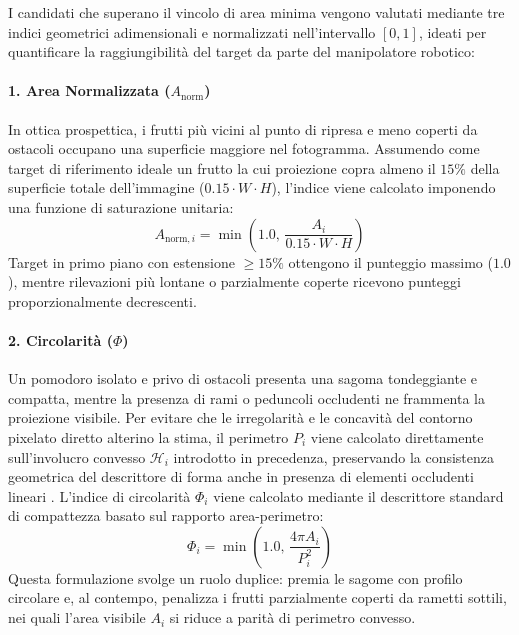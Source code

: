 I candidati che superano il vincolo di area minima vengono valutati mediante tre indici geometrici adimensionali e normalizzati nell'intervallo $[0, 1]$, ideati per quantificare la raggiungibilità del target da parte del manipolatore robotico:

\paragraph{1. Area Normalizzata ($A_{\text{norm}}$)}
In ottica prospettica, i frutti più vicini al punto di ripresa e meno coperti da ostacoli occupano una superficie maggiore nel fotogramma. Assumendo come target di riferimento ideale un frutto la cui proiezione copra almeno il $15\%$ della superficie totale dell'immagine ($0.15 \cdot W \cdot H$), l'indice viene calcolato imponendo una funzione di saturazione unitaria:
\begin{equation}
    A_{\text{norm}, i} = \min \left( 1.0, \, \frac{A_i}{0.15 \cdot W \cdot H} \right)
    \label{eq:area_norm}
\end{equation}
Target in primo piano con estensione $\ge 15\%$ ottengono il punteggio massimo ($1.0$), mentre rilevazioni più lontane o parzialmente coperte ricevono punteggi proporzionalmente decrescenti.

\paragraph{2. Circolarità ($\Phi$)}
Un pomodoro isolato e privo di ostacoli presenta una sagoma tondeggiante e compatta, mentre la presenza di rami o peduncoli occludenti ne frammenta la proiezione visibile. Per evitare che le irregolarità e le concavità del contorno pixelato diretto alterino la stima, il perimetro $P_i$ viene calcolato direttamente sull'involucro convesso $\mathcal{H}_i$ introdotto in precedenza, preservando la consistenza geometrica del descrittore di forma anche in presenza di elementi occludenti lineari \cite{zunic2004convexity}. L'indice di circolarità $\Phi_i$ viene calcolato mediante il descrittore standard di compattezza basato sul rapporto area-perimetro:
\begin{equation}
    \Phi_i = \min \left( 1.0, \, \frac{4\pi A_i}{P_i^2} \right)
    \label{eq:circolarita}
\end{equation}
Questa formulazione svolge un ruolo duplice: premia le sagome con profilo circolare e, al contempo, penalizza i frutti parzialmente coperti da rametti sottili, nei quali l'area visibile $A_i$ si riduce a parità di perimetro convesso.

